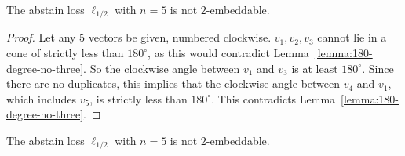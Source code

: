 \documentclass[anon]{colt2020} %
\begin{document}
\begin{proposition}
	The abstain loss $\ell_{1/2}$ with $n=5$ is not $2$-embeddable.
\end{proposition}
\begin{proof}
  Let any $5$ vectors be given, numbered clockwise.
  $v_1,v_2,v_3$ cannot lie in a cone of strictly less than $180^{\circ}$, as this would contradict Lemma~\ref{lemma:180-degree-no-three}.
  So the clockwise angle between $v_1$ and $v_3$ is at least $180^{\circ}$.
  Since there are no duplicates, this implies that the clockwise angle between $v_4$ and $v_1$, which includes $v_5$, is strictly less than $180^{\circ}$.
  This contradicts Lemma~\ref{lemma:180-degree-no-three}.
\end{proof}

\begin{proposition}
	The abstain loss $\ell_{1/2}$ with $n=5$ is not $2$-embeddable.
\end{proposition}
\end{document}
